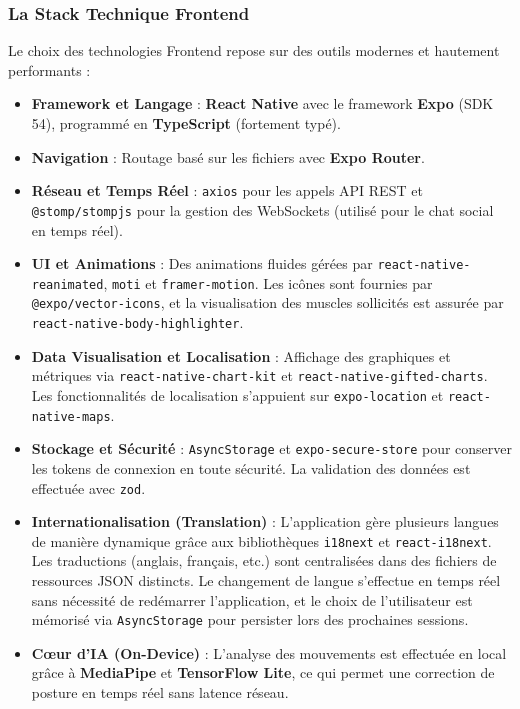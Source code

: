 \subsubsection{La Stack Technique Frontend}
Le choix des technologies Frontend repose sur des outils modernes et hautement performants :
\begin{itemize}
    \item \textbf{Framework et Langage} : \textbf{React Native} avec le framework \textbf{Expo} (SDK 54), programmé en \textbf{TypeScript} (fortement typé).
    \item \textbf{Navigation} : Routage basé sur les fichiers avec \textbf{Expo Router}.
    \item \textbf{Réseau et Temps Réel} : \texttt{axios} pour les appels API REST et \texttt{@stomp/stompjs} pour la gestion des WebSockets (utilisé pour le chat social en temps réel).
    \item \textbf{UI et Animations} : Des animations fluides gérées par \texttt{react-native-reanimated}, \texttt{moti} et \texttt{framer-motion}. Les icônes sont fournies par \texttt{@expo/vector-icons}, et la visualisation des muscles sollicités est assurée par \texttt{react-native-body-highlighter}.
    \item \textbf{Data Visualisation et Localisation} : Affichage des graphiques et métriques via \texttt{react-native-chart-kit} et \texttt{react-native-gifted-charts}. Les fonctionnalités de localisation s'appuient sur \texttt{expo-location} et \texttt{react-native-maps}.
    \item \textbf{Stockage et Sécurité} : \texttt{AsyncStorage} et \texttt{expo-secure-store} pour conserver les tokens de connexion en toute sécurité. La validation des données est effectuée avec \texttt{zod}.
    \item \textbf{Internationalisation (Translation)} : L'application gère plusieurs langues de manière dynamique grâce aux bibliothèques \texttt{i18next} et \texttt{react-i18next}. Les traductions (anglais, français, etc.) sont centralisées dans des fichiers de ressources JSON distincts. Le changement de langue s'effectue en temps réel sans nécessité de redémarrer l'application, et le choix de l'utilisateur est mémorisé via \texttt{AsyncStorage} pour persister lors des prochaines sessions.
    \item \textbf{Cœur d'IA (On-Device)} : L'analyse des mouvements est effectuée en local grâce à \textbf{MediaPipe} et \textbf{TensorFlow Lite}, ce qui permet une correction de posture en temps réel sans latence réseau.
\end{itemize}

